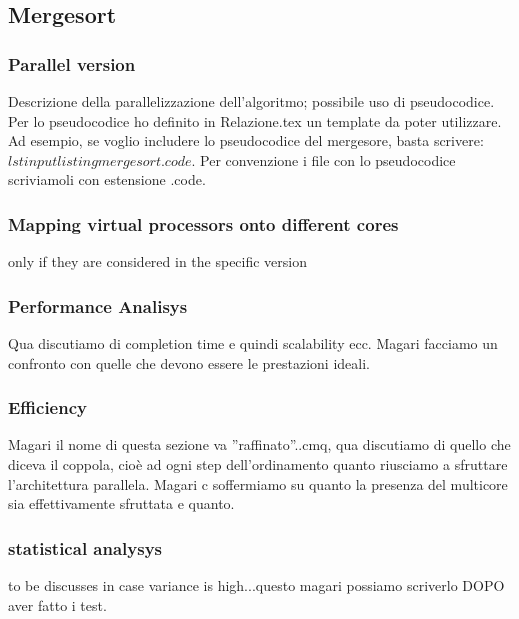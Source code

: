 \subsection{Mergesort}
\subsubsection{Parallel version}
Descrizione della parallelizzazione dell'algoritmo; possibile uso di pseudocodice. Per lo pseudocodice ho definito in Relazione.tex un template da poter utilizzare. Ad esempio, se voglio includere lo pseudocodice del mergesore, basta scrivere: $lstinputlisting{mergesort.code}$. Per convenzione i file con lo pseudocodice scriviamoli con estensione .code.
\subsubsection{Mapping virtual processors onto different cores} 
only if they are considered in the specific version
\subsubsection{Performance Analisys} 
Qua discutiamo di completion time e quindi scalability ecc. Magari facciamo un confronto con quelle che devono essere le prestazioni ideali.
\subsubsection{Efficiency} 
Magari il nome di questa sezione va ''raffinato''..cmq, qua discutiamo di quello che diceva il coppola, cioè ad ogni step dell'ordinamento quanto riusciamo a sfruttare l'architettura parallela. Magari c soffermiamo su quanto la presenza del multicore sia effettivamente sfruttata e quanto. 
\subsubsection{statistical analysys}
 to be discusses in case variance is high...questo magari possiamo scriverlo DOPO aver fatto i test.
